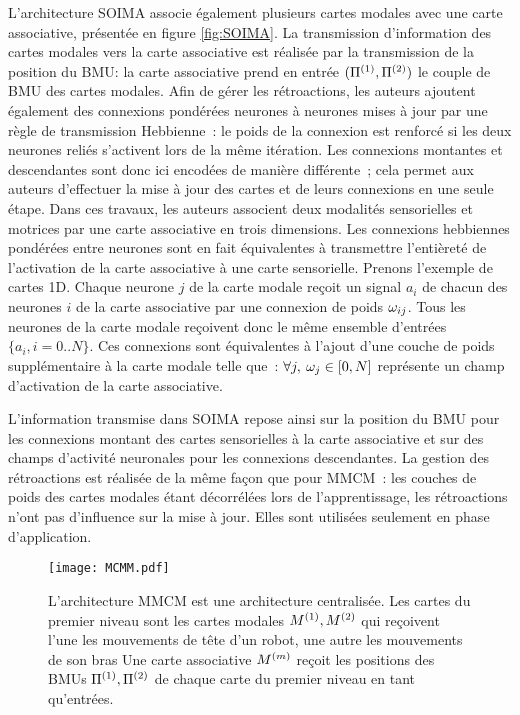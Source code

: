 \documentclass[../main]{subfiles}
\begin{document}
L'architecture SOIMA \cite{escobar-juarez_self-organized_2016} associe également plusieurs cartes modales avec une carte associative, présentée en figure \ref{fig:SOIMA}.
La transmission d'information des cartes modales vers la carte associative est réalisée par la transmission de la position du BMU: la carte associative prend en entrée $(\Pi^{({1})},\Pi^{({2})})$ le couple de BMU des cartes modales. 
Afin de gérer les rétroactions, les auteurs ajoutent également des connexions pondérées neurones à neurones mises à jour par une règle de transmission Hebbienne~: le poids de la connexion est renforcé si les deux neurones reliés s'activent lors de la même itération.
Les connexions montantes et descendantes sont donc ici encodées de manière différente~; cela permet aux auteurs d'effectuer la mise à jour des cartes et de leurs connexions en une seule étape. Dans ces travaux, les auteurs associent deux modalités sensorielles et motrices par une carte associative en trois dimensions.
Les connexions hebbiennes pondérées entre neurones sont en fait équivalentes à transmettre l'entièreté de l'activation de la carte associative à une carte sensorielle.
Prenons l'exemple de cartes 1D.
Chaque neurone $j$ de la carte modale reçoit un signal $a_{i}$ de chacun des neurones $i$ de la carte associative par une connexion de poids $\omega_{ij}$. Tous les neurones de la carte modale reçoivent donc le même ensemble d'entrées $ \{a_{i}, i = 0 .. N\}$.
Ces connexions sont équivalentes à l'ajout d'une couche de poids supplémentaire à la carte modale telle que~: $\forall j, \: \omega_j \in [0,N]$ représente un champ d'activation de la carte associative.


L'information transmise dans SOIMA repose ainsi sur la position du BMU pour les connexions montant des cartes sensorielles à la carte associative et sur des champs d'activité neuronales pour les connexions descendantes.
La gestion des rétroactions est réalisée de la même façon que pour MMCM~: les couches de poids des cartes modales étant décorrélées lors de l'apprentissage, les rétroactions n'ont pas d'influence sur la mise à jour. Elles sont utilisées seulement en phase d'application.



\begin{figure}[t]
    \centering
    \texttt{[image: MCMM.pdf]}
    \caption{L'architecture MMCM \cite{dominey13} est une architecture centralisée.
    Les cartes du premier niveau sont les cartes modales $M^{({1})}, M^{({2})}$ qui reçoivent l'une les mouvements de tête d'un robot, une autre les mouvements de son bras
    Une carte associative $M^{({m})}$ reçoit les positions des BMUs $\Pi^{({1})},\Pi^{({2})}$ de chaque carte du premier niveau en tant qu'entrées. 
    \label{fig:mmcm}}
\end{figure}
\end{document}
